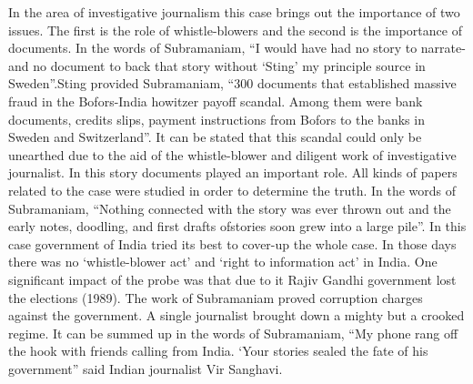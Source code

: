 \begin{multicols}{2}
\noi
In the area of investigative journalism this case brings out the importance of two issues. The
first is the role of whistle-blowers and the second is the importance of documents. In the words
of Subramaniam, “I would have had no story to narrate-and no document to back that story
without ‘Sting’ my principle source in Sweden”.Sting provided Subramaniam, “300 documents
that established massive fraud in the Bofors-India howitzer payoff scandal. Among them were
bank documents, credits slips, payment instructions from Bofors to the banks in Sweden and
Switzerland”. It can be stated that this scandal could only be unearthed due to the aid of the
whistle-blower and diligent work of investigative journalist. In this story documents played an
important role. All kinds of papers related to the case were studied in order to determine the
truth. In the words of Subramaniam, “Nothing connected with the story was ever thrown out
and the early notes, doodling, and first drafts ofstories soon grew into a large pile”. In this case
government of India tried its best to cover-up the whole case. In those days there was no
‘whistle-blower act’ and ‘right to information act’ in India. One significant impact of the probe
was that due to it Rajiv Gandhi government lost the elections (1989). The work of
Subramaniam proved corruption charges against the government. A single journalist brought
down a mighty but a crooked regime. It can be summed up in the words of Subramaniam, “My
phone rang off the hook with friends calling from India. ‘Your stories sealed the fate of his
government” said Indian journalist Vir Sanghavi.


\end{multicols}
